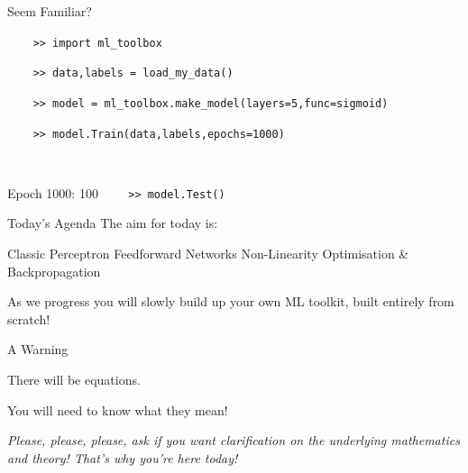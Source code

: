 \documentclass[]{SangerLibrary/sanger-present}
\begin{document}
{\begin{frame}[fragile]{\color{computer}Seem Familiar?}
			{\color{computer}
			\verb|    >> import ml_toolbox|\par\par
			\verb|    >> data,labels = load_my_data()|\par\par
			\verb|    >> model = ml_toolbox.make_model(layers=5,func=sigmoid)|\par\par
			\verb|    >> model.Train(data,labels,epochs=1000)|\par~\par
			\verb@    Epoch 1000: 100%|xxxxxxxxxxxxxxxx| [final loss = 1.382]@\par~\par
			\pause\verb|    >> model.Test()|
			}
			
		\end{frame}
		
	}

	\begin{frame}{Today's Agenda}
		The aim for today is:

		\begin{itemize}
			\pitem Classic Perceptron
			\pitem Feedforward Networks
			\pitem Non-Linearity
			\pitem Optimisation \& Backpropagation
		\end{itemize}

		\pause As we progress you will slowly build up your own ML toolkit, built entirely from scratch! 

	\end{frame}

	\setcounter{custompart}{0}
	\newcommand\partFrame[1]
	{
		\stepcounter{custompart}
		\begin{frame}{}
			\begin{center}
				\Wellcome \huge Part \thecustompart

				#1
			\end{center}
		\end{frame}
	}
	
	\begin{frame}{A Warning}
		
		\begin{center}
			{\Large There will be equations.}
			
			{\pause \Large You will need to know what they mean!}

			{\pause \it Please, please, please, ask if you want clarification on the underlying mathematics and theory! That's why you're here today!} 
		\end{center}
	\end{frame}
\end{document}
